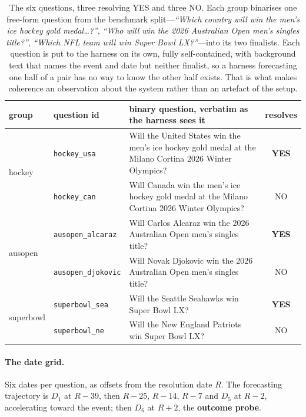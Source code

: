 \documentclass[10pt]{article}
\newcommand{\hr}[1]{\texttt{#1}}
\begin{document}
\begin{table}[htbp]\centering\small
\begin{tabular}{@{}llp{7.4cm}c@{}}
\toprule
group & question id & binary question, verbatim as the harness sees it & resolves \\
\midrule
\multirow{2}{*}{hockey} & \hr{hockey\_usa} & Will the United States win the men's ice hockey gold
medal at the Milano Cortina 2026 Winter Olympics? & \textbf{YES} \\[2pt]
 & \hr{hockey\_can} & Will Canada win the men's ice hockey gold medal at the Milano Cortina 2026
Winter Olympics? & NO \\
\midrule
\multirow{2}{*}{ausopen} & \hr{ausopen\_alcaraz} & Will Carlos Alcaraz win the 2026 Australian
Open men's singles title? & \textbf{YES} \\[2pt]
 & \hr{ausopen\_djokovic} & Will Novak Djokovic win the 2026 Australian Open men's singles
title? & NO \\
\midrule
\multirow{2}{*}{superbowl} & \hr{superbowl\_sea} & Will the Seattle Seahawks win Super Bowl
LX? & \textbf{YES} \\[2pt]
 & \hr{superbowl\_ne} & Will the New England Patriots win Super Bowl LX? & NO \\
\bottomrule
\end{tabular}
\caption{The six questions, three resolving YES and three NO. Each group binarises one
free-form question from the benchmark split---\emph{``Which country will win the men's ice hockey
gold medal\ldots?''}, \emph{``Who will win the 2026 Australian Open men's singles title?''},
\emph{``Which NFL team will win Super Bowl LX?''}---into its two finalists. Each question is put
to the harness on its own, fully self-contained, with background text that names the event and
date but neither finalist, so a harness forecasting one half of a pair has no way to know the
other half exists. That is what makes coherence an observation about the system rather than an
artefact of the setup.}
\label{tab:questions}
\end{table}

\paragraph{The date grid.} Six dates per question, as offsets from the resolution date $R$. The
forecasting trajectory is $D_1$ at $R{-}39$, then $R{-}25$, $R{-}14$, $R{-}7$ and $D_5$ at
$R{-}2$, accelerating toward the event; then $D_6$ at $R{+}2$, the \textbf{outcome probe}.
\end{document}
